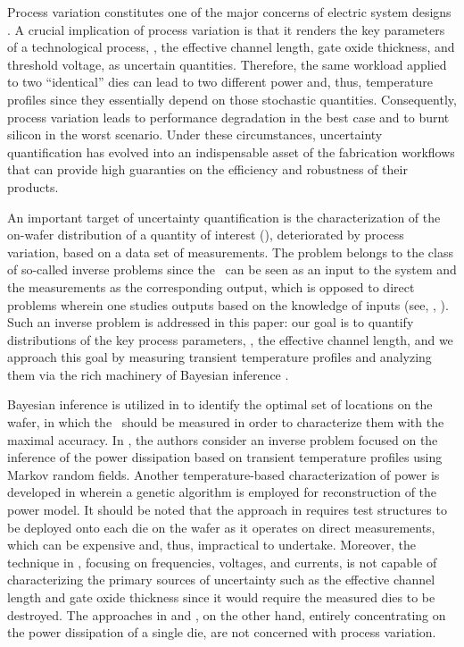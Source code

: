 Process variation constitutes one of the major concerns of electric system designs \cite{chandrakasan2001, srivastava2010}. A crucial implication of process variation is that it renders the key parameters of a technological process, \eg, the effective channel length, gate oxide thickness, and threshold voltage, as uncertain quantities.
Therefore, the same workload applied to two ``identical'' dies can lead to two different power and, thus, temperature profiles since they essentially depend on those stochastic quantities.
Consequently, process variation leads to performance degradation in the best case and to burnt silicon in the worst scenario.
Under these circumstances, uncertainty quantification has evolved into an indispensable asset of the fabrication workflows that can provide high guaranties on the efficiency and robustness of their products.

An important target of uncertainty quantification is the characterization of the on-wafer distribution of a quantity of interest (\qoi), deteriorated by process variation, based on a data set of measurements.
The problem belongs to the class of so-called inverse problems since the \qoi\ can be seen as an input to the system and the measurements as the corresponding output, which is opposed to direct problems wherein one studies outputs based on the knowledge of inputs (see, \eg, \cite{juan2011, juan2012}).
Such an inverse problem is addressed in this paper: our goal is to quantify distributions of the key process parameters, \eg, the effective channel length, and we approach this goal by measuring transient temperature profiles and analyzing them via the rich machinery of Bayesian inference \cite{gelman2004}.

Bayesian inference is utilized in \cite{zhang2010} to identify the optimal set of locations on the wafer, in which the \qois\ should be measured in order to characterize them with the maximal accuracy.
In \cite{paek2012}, the authors consider an inverse problem focused on the inference of the power dissipation based on transient temperature profiles using Markov random fields.
Another temperature-based characterization of power is developed in \cite{mesa-martinez2007} wherein a genetic algorithm is employed for reconstruction of the power model.
It should be noted that the approach in \cite{zhang2010} requires test structures to be deployed onto each die on the wafer as it operates on direct measurements, which can be expensive and, thus, impractical to undertake. Moreover, the technique in \cite{zhang2010}, focusing on frequencies, voltages, and currents, is not capable of characterizing the primary sources of uncertainty such as the effective channel length and gate oxide thickness since it would require the measured dies to be destroyed. The approaches in \cite{paek2012} and \cite{mesa-martinez2007}, on the other hand, entirely concentrating on the power dissipation of a single die, are not concerned with process variation.


